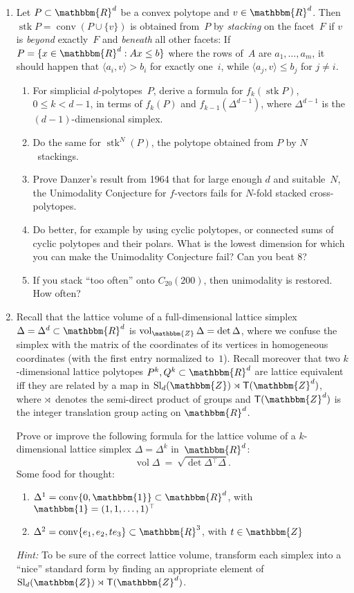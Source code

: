 \documentclass[11pt]{amsart}
\newcommand{\R}{\mathbbm{R}}
\newcommand{\Z}{\mathbbm{Z}}
\newcommand{\sT}{\mathsf{T}}
\DeclareMathOperator{\conv}{conv}
\DeclareMathOperator{\stack}{stk}
\DeclareMathOperator{\vol}{vol}
\DeclareMathOperator{\Sl}{Sl}
\begin{document}
\begin{enumerate}
\setlength{\itemsep}{1ex}
\item Let $P\subset\R^d$ be a convex polytope and $v\in\R^d$. Then $\stack P=\conv(P\cup\{v\})$ is obtained from~$P$ by \emph{stacking} on the facet~$F$ if $v$ is \emph{beyond} exactly~$F$ and \emph{beneath} all other facets: If $P=\{x\in\R^d: Ax\le b\}$ where the rows of~$A$ are $a_1,\dots, a_m$, it should happen that $\langle a_i,v\rangle > b_i$ for exactly one~$i$, while $\langle a_j,v\rangle \le b_j$ for  $j\ne i$.
\begin{enumerate}
\item For simplicial $d$-polytopes~$P$, derive a formula for $f_k(\stack P)$, $0\le k<d-1$,  in terms of $f_k(P)$ and $f_{k-1}(\Delta^{d-1})$, where $\Delta^{d-1}$ is the $(d-1)$-dimensional simplex.
\item Do the same for $\stack^{N}(P)$, the polytope obtained from $P$ by $N$~stackings.
\item Prove Danzer's result from 1964 that for large enough $d$ and suitable~$N$, the Unimodality Conjecture for $f$-vectors fails for $N$-fold stacked cross-polytopes.
\item Do better, for example by using cyclic polytopes, or connected sums of cyclic polytopes and their polars. What is the lowest dimension for which you can make the Unimodality Conjecture fail? Can you beat 8?
\item If you stack ``too often'' onto $C_{20}(200)$, then unimodality is restored. How often?
\end{enumerate}

\item Recall that the lattice volume of a full-dimensional lattice simplex $\Delta=\Delta^d\subset\R^d$ is $\vol_\Z\Delta = \det\Delta$, where we confuse the simplex with the matrix of the coordinates of its vertices in homogeneous coordinates (with the first entry normalized to~$1$).
Recall moreover that two $k$-dimensional lattice polytopes $P^k,Q^k\subset\R^d$ are lattice equivalent iff they are related by a map in $\Sl_d(\Z)\rtimes \sT(\Z^d)$, where $\rtimes$~denotes the semi-direct product of groups and $\sT(\Z^d)$ is the integer translation group acting on $\R^d$. 

Prove or improve the following formula for the lattice volume of a $k$-dimensional lattice simplex $\Delta=\Delta^k$ in~$\R^d$:
\[
    \vol\Delta
    \ = \
    \sqrt{\det \Delta\!^\top\Delta}.
\]
Some food for thought:
\begin{enumerate}
\item $\Delta^1 = \conv\{0,\mathbbm{1}\}\subset\R^d$, with $\mathbbm{1} = (1,1,\dots,1)^\top$
\item $\Delta^2 = \conv\{e_1, e_2, te_3\}\subset\R^3$, with $t\in\Z$
\end{enumerate}
\emph{Hint:} To be sure of the correct lattice volume, transform each simplex into a ``nice'' standard form by finding an appropriate element of $\Sl_d(\Z)\rtimes \sT(\Z^d)$.
\end{enumerate}
\end{document}
